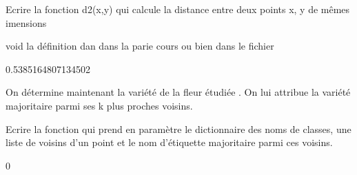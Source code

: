 \documentclass[letterpaper,10pt,english]{jupyterBook}
\begin{document}
\sphinxAtStartPar
Ecrire la fonction d2(x,y) qui calcule la distance entre deux points x, y de mêmes imensions

\sphinxAtStartPar
void la définition dan dans la parie cours ou bien dans le fichier 
\begin{sphinxVerbatimInput}

\begin{sphinxVerbatim}[commandchars=\\\{\}]
\PYG{p}{[}\PYG{p}{]}\PYG{p}{[}\PYG{p}{]}
\end{sphinxVerbatim}
\end{sphinxVerbatimInput}
\begin{sphinxVerbatimOutput}

\begin{sphinxVerbatim}[commandchars=\\\{\}]
0.5385164807134502
\end{sphinxVerbatim}
\end{sphinxVerbatimOutput}

\sphinxAtStartPar
On détermine maintenant la variété de la fleur étudiée .
On lui attribue la variété   majoritaire parmi ses k plus proches voisins.

\sphinxAtStartPar
Ecrire la fonction qui prend en paramètre le dictionnaire des noms de classes, une liste de voisins d’un point et le nom d’étiquette majoritaire parmi ces voisins.
\begin{sphinxVerbatimInput}

\begin{sphinxVerbatim}[commandchars=\\\{\}]
\PYG{p}{[}   \PYG{p}{]}
\end{sphinxVerbatim}
\end{sphinxVerbatimInput}
\begin{sphinxVerbatimInput}

\begin{sphinxVerbatim}[commandchars=\\\{\}]
\end{sphinxVerbatim}
\end{sphinxVerbatimInput}
\begin{sphinxVerbatimOutput}

\begin{sphinxVerbatim}[commandchars=\\\{\}]
0
\end{sphinxVerbatim}
\end{sphinxVerbatimOutput}
\end{document}
